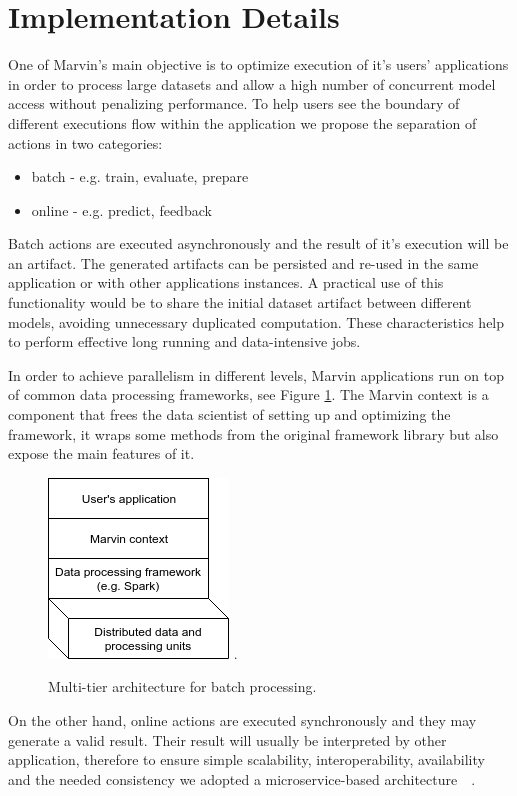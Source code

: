 \documentclass[twoside,11pt]{article}
\begin{document}
\section{Implementation Details}

One of Marvin's main objective is to optimize execution of it's users' applications in order to process large datasets and allow a high number of concurrent model access without penalizing performance. To help users see the boundary of different executions flow within the application we propose the separation of actions in two categories:
\begin{itemize}
    \item batch - e.g. train, evaluate, prepare
    \item online - e.g. predict, feedback
\end{itemize}

Batch actions are executed asynchronously and the result of it's execution will be an artifact. The generated artifacts can be persisted and re-used in the same application or with other applications instances. A practical use of this functionality would be to share the initial dataset artifact between different models, avoiding unnecessary duplicated computation. These characteristics help to perform effective long running and data-intensive jobs.

In order to achieve parallelism in different levels, Marvin applications run on top of common data processing frameworks, see Figure \ref{fig_spark}. The Marvin context is a component that frees the data scientist of setting up and optimizing the framework, it wraps some methods from the original framework library but also expose the main features of it.
\begin{figure}[h]
\centering
\includegraphics[scale=0.7]{fig/marvin-spark.png}
\DeclareGraphicsExtensions.
\caption{Multi-tier architecture for batch processing.}
\label{fig_spark}
\end{figure}

On the other hand, online actions are executed synchronously and they may generate a valid result. Their result will usually be interpreted by other application, therefore to ensure simple scalability, interoperability, availability and the needed consistency we adopted a microservice-based architecture~\citep{brewer2000towards}~\citep{fowler2014microservices}.
\end{document}
